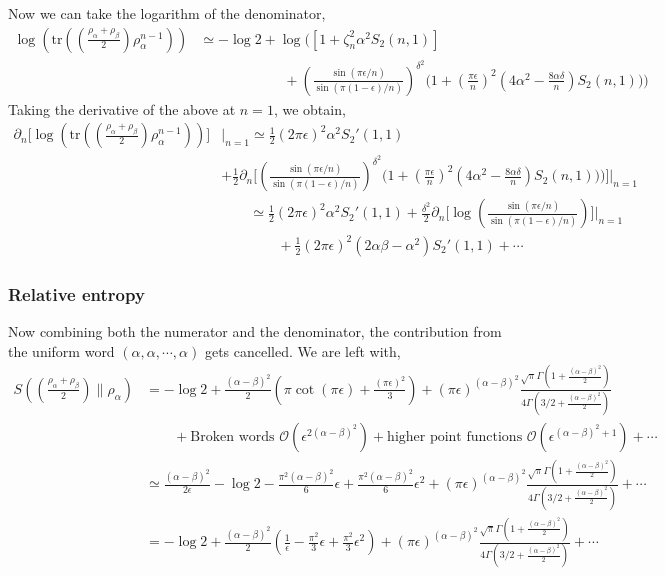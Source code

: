 \documentclass[11pt]{article}
\newcommand{\ep}{\epsilon}
\newcommand{\p}{\partial}
\newcommand{\mO}{\mathcal{O}}
\newcommand{\nn}{\nonumber}
\newcommand{\lb}{\left(}
\newcommand{\rb}{\right)}
\begin{document}
Now we can take the logarithm of the denominator,
\begin{align}
    \log \lb \text{tr}\lb \lb \frac{\rho_\alpha + \rho_\beta}{2}\rb \rho_\alpha^{n-1} \rb\rb &\simeq -\log 2 + \log \Bigg( \left[1+\zeta_n^2\alpha^2 S_2(n,1)\right] \nn\\
    &\qquad \qquad \qquad +  \lb\frac{\sin(\pi\ep/n)}{\sin(\pi(1-\ep)/n)}\rb^{\delta^2}\Bigg( 1 + \lb\frac{\pi\ep}{n}\rb^2 \lb4\alpha^2 - \frac{8\alpha \delta}{n}\rb S_2(n,1)
\Bigg) \Bigg)
\end{align}
Taking the derivative of the above at $n=1$, we obtain,
\begin{align}
    \p_n \Bigg[\log \lb \text{tr}\lb \lb \frac{\rho_\alpha + \rho_\beta}{2}\rb \rho_\alpha^{n-1} \rb\rb\Bigg]&\Bigg|_{n=1} \simeq \frac{1}{2} \lb2\pi \ep\rb^2 \alpha^2 S_2'(1,1) \nn \\
    &+ \frac{1}{2}\p_n  \Bigg[\lb\frac{\sin(\pi\ep/n)}{\sin(\pi(1-\ep)/n)}\rb^{\delta^2}\Bigg( 1 + \lb\frac{\pi\ep}{n}\rb^2 \lb4\alpha^2 - \frac{8\alpha \delta}{n}\rb S_2(n,1)
\Bigg) \Bigg)\Bigg]\Bigg|_{n=1} \\ 
&\qquad \simeq  \frac{1}{2} \lb2\pi \ep\rb^2 \alpha^2 S_2'(1,1) + \frac{\delta^2}{2} \p_n \Bigg[\log \lb\frac{\sin(\pi\ep/n)}{\sin(\pi(1-\ep)/n)}\rb\Bigg]\Bigg|_{n=1} \nn\\&\qquad\qquad +  \frac{1}{2}\lb2\pi\ep\rb^2 \lb 2\alpha\beta -\alpha^2 \rb S_2'(1,1) + \cdots 
\end{align}\subsubsection{Relative entropy}
Now combining both the numerator and the denominator, the contribution from the uniform word $(\alpha,\alpha,\cdots,\alpha)$ gets cancelled. We are left with,
\begin{align}
    S\lb\lb\frac{\rho_\alpha + \rho_\beta}{2}\rb\Bigg\| \rho_\alpha\rb &= -\log 2 + \frac{(\alpha-\beta)^2}{2}\lb \pi \cot(\pi \ep) + \frac{\lb\pi\ep\rb^2}{3} \rb + \lb\pi \ep\rb^{(\alpha-\beta)^2} \frac{\sqrt \pi \Gamma\lb1+\frac{(\alpha-\beta)^2}{2}\rb}{4\Gamma\lb3/2 + \frac{(\alpha-\beta)^2}{2}\rb} \nn\\
    &\qquad +\text{Broken words }\mO(\ep^{2(\alpha-\beta)^2}) + \text{higher point functions  } \mO(\ep^{(\alpha-\beta)^2+1} )+\cdots \\
    &\simeq \frac{(\alpha-\beta)^2}{2\ep} -\log 2  - \frac{\pi^2 (\alpha-\beta)^2}{6}\ep + \frac{\pi^2 (\alpha-\beta)^2}{6}\ep^2  + \lb\pi \ep\rb^{(\alpha-\beta)^2} \frac{\sqrt \pi \Gamma\lb1+\frac{(\alpha-\beta)^2}{2}\rb}{4\Gamma\lb3/2 + \frac{(\alpha-\beta)^2}{2}\rb}
    +\cdots \\
    &= -\log 2 + \frac{(\alpha-\beta)^2}{2}\lb \frac{1}{\ep} - \frac{\pi^2}{3}\ep+ \frac{\pi^2}{3}\ep^2\rb + \lb\pi \ep\rb^{(\alpha-\beta)^2} \frac{\sqrt \pi \Gamma\lb1+\frac{(\alpha-\beta)^2}{2}\rb}{4\Gamma\lb3/2 + \frac{(\alpha-\beta)^2}{2}\rb}
    +\cdots
\end{align}
\end{document}
